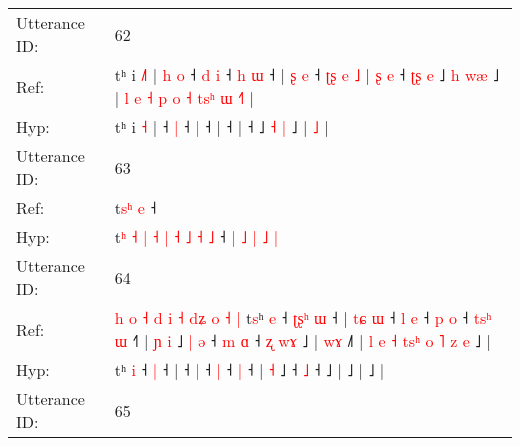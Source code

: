 \documentclass[10pt]{article}
\DeclareRobustCommand{\hl}[1]{{\textcolor{red}{#1}}}
\begin{document}
\begin{longtable}{ll}
 \\
\midrule
Utterance ID: & 62 \\
Ref: & tʰ i \hl{˩}\hl{˥} |\hl{ }\hl{h}\hl{ }\hl{o} ˧\hl{ }\hl{d} \hl{i} ˧\hl{ }\hl{h} \hl{ɯ} ˧ |\hl{ }\hl{ʂ}\hl{ }\hl{e} ˧\hl{ }\hl{ʈ}\hl{ʂ}\hl{ }\hl{e}\hl{ }\hl{˩} |\hl{ }\hl{ʂ}\hl{ }\hl{e} ˧\hl{ }\hl{ʈ}\hl{ʂ}\hl{ }\hl{e} ˩ \hl{h} \hl{w}\hl{æ} ˩ |\hl{ }\hl{l}\hl{ }\hl{e}\hl{ }\hl{˧}\hl{ }\hl{p}\hl{ }\hl{o}\hl{ }\hl{˧}\hl{ }\hl{t}\hl{s}\hl{ʰ}\hl{ }\hl{ɯ} \hl{˧}\hl{˥} |
 \\
Hyp: & tʰ i \hl{}\hl{˧} |\hl{}\hl{}\hl{}\hl{} ˧\hl{}\hl{} \hl{|} ˧\hl{}\hl{} \hl{|} ˧ |\hl{}\hl{}\hl{}\hl{} ˧\hl{}\hl{}\hl{}\hl{}\hl{}\hl{}\hl{} |\hl{}\hl{}\hl{}\hl{} ˧\hl{}\hl{}\hl{}\hl{}\hl{} ˩ \hl{˧} \hl{}\hl{|} ˩ |\hl{}\hl{}\hl{}\hl{}\hl{}\hl{}\hl{}\hl{}\hl{}\hl{}\hl{}\hl{}\hl{}\hl{}\hl{}\hl{}\hl{}\hl{} \hl{}\hl{˩} |
 \\
\midrule
Utterance ID: & 63 \\
Ref: & t\hl{}\hl{}\hl{}\hl{}\hl{}\hl{}\hl{}\hl{}\hl{}\hl{}\hl{}\hl{}\hl{}\hl{s}\hl{ʰ} \hl{e} ˧\hl{}\hl{}\hl{}\hl{}\hl{}\hl{}\hl{}\hl{}\hl{}\hl{}
 \\
Hyp: & t\hl{ʰ}\hl{ }\hl{˧}\hl{ }\hl{|}\hl{ }\hl{˧}\hl{ }\hl{|}\hl{ }\hl{˧}\hl{ }\hl{˩}\hl{ }\hl{˧} \hl{˩} ˧\hl{ }\hl{|}\hl{ }\hl{˩}\hl{ }\hl{|}\hl{ }\hl{˩}\hl{ }\hl{|}
 \\
\midrule
Utterance ID: & 64 \\
Ref: & \hl{h}\hl{ }\hl{o}\hl{ }\hl{˧}\hl{ }\hl{d}\hl{ }\hl{i}\hl{ }\hl{˧}\hl{ }\hl{d}\hl{ʑ}\hl{ }\hl{o}\hl{ }\hl{˧}\hl{ }\hl{|}\hl{ }t\hl{s}ʰ \hl{e} ˧\hl{ }\hl{ʈ}\hl{ʂ}\hl{ʰ} \hl{ɯ} ˧ |\hl{ }\hl{t}\hl{ɕ}\hl{ }\hl{ɯ} ˧\hl{ }\hl{l} \hl{e} ˧\hl{ }\hl{p} \hl{o} ˧\hl{ }\hl{t}\hl{s}\hl{ʰ} \hl{ɯ} ˧\hl{˥} |\hl{ }\hl{ɲ} \hl{i} ˩\hl{ }\hl{|}\hl{ }\hl{ə} ˧\hl{ }\hl{m} \hl{ɑ} ˧\hl{ }\hl{ʐ}\hl{ }\hl{w}\hl{ɤ} ˩ |\hl{ }\hl{w}\hl{ɤ} ˩\hl{˥} |\hl{ }\hl{l}\hl{ }\hl{e}\hl{ }\hl{˧}\hl{ }\hl{t}\hl{s}\hl{ʰ}\hl{ }\hl{o}\hl{ }\hl{˥}\hl{ }\hl{z}\hl{ }\hl{e} ˩ |
 \\
Hyp: & \hl{}\hl{}\hl{}\hl{}\hl{}\hl{}\hl{}\hl{}\hl{}\hl{}\hl{}\hl{}\hl{}\hl{}\hl{}\hl{}\hl{}\hl{}\hl{}\hl{}\hl{}t\hl{}ʰ \hl{i} ˧\hl{}\hl{}\hl{}\hl{} \hl{|} ˧ |\hl{}\hl{}\hl{}\hl{}\hl{} ˧\hl{}\hl{} \hl{|} ˧\hl{}\hl{} \hl{|} ˧\hl{}\hl{}\hl{}\hl{} \hl{|} ˧\hl{} |\hl{}\hl{} \hl{˧} ˩\hl{}\hl{}\hl{}\hl{} ˧\hl{}\hl{} \hl{˩} ˧\hl{}\hl{}\hl{}\hl{}\hl{} ˩ |\hl{}\hl{}\hl{} ˩\hl{} |\hl{}\hl{}\hl{}\hl{}\hl{}\hl{}\hl{}\hl{}\hl{}\hl{}\hl{}\hl{}\hl{}\hl{}\hl{}\hl{}\hl{}\hl{} ˩ |
 \\
\midrule
Utterance ID: & 65 \\

\end{longtable}
\end{document}

